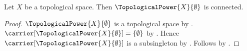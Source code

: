 \begin{theorem}\label{empty_topological_power_is_connected}
    Let $X$ be a topological space.
    Then $\TopologicalPower{X}{\emptyset}$ is connected.
\end{theorem}
\begin{proof}
    $\TopologicalPower{X}{\emptyset}$ is a topological space by
        .
    $\carrier[\TopologicalPower{X}{\emptyset}]=\{\emptyset\}$ by
        .
    Hence $\carrier[\TopologicalPower{X}{\emptyset}]$ is a subsingleton by .
    Follows by .
\end{proof}
